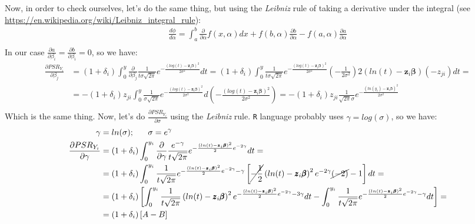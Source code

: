 \documentclass[]{article}
\begin{document}
Now, in order to check ourselves, let's do the same thing, but using the \emph{Leibniz} rule of taking a derivative under the integral (see \url{https://en.wikipedia.org/wiki/Leibniz_integral_rule}):
  $$
  \begin{aligned}
    \frac{d\phi}{d\alpha} = \int_a^b   \frac{\partial}{\partial\alpha}f(x, \alpha)dx +  f(b, \alpha)\frac{\partial b}{\partial\alpha}  - f(a, \alpha)\frac{\partial a}{\partial\alpha} \\
  \end{aligned}
  $$
In our case $\frac{\partial a}{\partial\beta_i} = \frac{\partial b}{\partial\beta_i} = 0$, so we have:
  $$
  \begin{aligned}
    \frac{\partial PSR_{Y_i}}{\partial \beta_j} &=(1+\delta_i) \int_0^y  \frac{\partial}{\partial \beta_j}  \frac{1}{t \sigma\sqrt{2 \pi }} e^{-\frac{(log(t) - \pmb{z}_i\pmb{\beta})^2}{2\sigma^2}} dt = (1+\delta_i) \int_0^y   \frac{1}{t \sigma\sqrt{2 \pi }} e^{-\frac{(log(t) - \pmb{z}_i\pmb{\beta})^2}{2\sigma^2}}  \left(   -\frac{1}{2\sigma^2}   \right)  2(ln(t) - \pmb{z}_i\pmb{\beta})(-z_{ji})dt  =\\
    &= -(1+\delta_i)z_{ji} \int_0^y   \frac{1}{\sigma\sqrt{2 \pi }} e^{-\frac{(log(t) - \pmb{z}_i\pmb{\beta})^2}{2\sigma^2}}  d\left(   -\frac{(log(t) - \pmb{z}_i\pmb{\beta})^2}{2\sigma^2}   \right) =  -(1+\delta_i)z_{ji}  \frac{1}{\sqrt{2\pi} \sigma}    e^{ - \frac{\left( ln(y_i) -\pmb{z}_i\pmb{\beta} \right)^2}{2\sigma^2} }\\
  \end{aligned}
  $$
Which is the same thing. Now, let's do $\frac{\partial PSR_{Y_i}}{\partial \sigma}$ using the \emph{Leibniz} rule. \texttt{R} language probably uses $\gamma = log(\sigma)$, so we have: 
  $$
  \begin{aligned}
    \gamma &= ln(\sigma);~~~~~  \sigma= e^{\gamma}\\
    \frac{\partial PSR_{Y_i}}{\partial \gamma} &=(1+\delta_i) \int_0^{y_i}  \frac{\partial}{\partial \gamma}  \frac{e^{-\gamma}}{t \sqrt{2 \pi }} e^{-\frac{(ln(t) - \pmb{z}_i\pmb{\beta})^2}{2}e^{-2\gamma}} dt = \\
    &=(1+\delta_i) \int_0^{y_i}   \frac{1}{t \sqrt{2 \pi }} e^{-\frac{(ln(t) - \pmb{z}_i\pmb{\beta})^2}{2}e^{-2\gamma} - \gamma} \left[   \cancel{-\frac{1}{2}} \left(  ln(t) -  \pmb{z}_i\pmb{\beta}  \right)^2  e^{-2\gamma}\cancel{(-2)} - 1  \right] dt  =\\
    &=(1+\delta_i) \left[       \int_0^{y_i}   \frac{1}{t \sqrt{2 \pi }}  \left(  ln(t) -  \pmb{z}_i\pmb{\beta}  \right)^2 e^{-\frac{(ln(t) - \pmb{z}_i\pmb{\beta})^2}{2}e^{-2\gamma} - 3\gamma} dt     -     \int_0^{y_i}   \frac{1}{t \sqrt{2 \pi }}  e^{-\frac{(ln(t) - \pmb{z}_i\pmb{\beta})^2}{2}e^{-2\gamma} - \gamma}  dt  \right] = \\
    & =(1+\delta_i) \left[       A - B  \right]
  \end{aligned}
  $$
\end{document}

